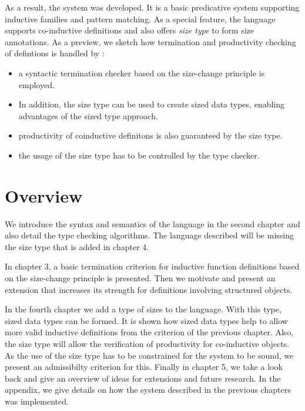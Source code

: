 As a result, the system \mugda was developed.
It is a basic predicative system supporting inductive families and pattern matching. 
As a special feature, the language supports co-inductive definitions and also offers \emph{size type} to form size annotations. 
As a preview, we sketch how termination and productivity checking of defintions is handled by \mugda:
\begin{itemize}
\item
a syntactic termination checker based on the size-change principle is employed.
\item
In addition, the size type can be used to create sized data types, enabling advantages of the 
sized type approach.
\item
productivity of coinductive definitons is also guaranteed by the size type.
\item
the usage of the size type has to be controlled by the type checker.
\end{itemize}  
\section{Overview}
We introduce the syntax and semantics of the \mugda language in the second chapter and also detail the type checking algorithms. The language described will be missing the size type that is added in chapter 4. 

In chapter 3, a basic termination criterion for inductive function definitions based on the size-change principle is presented. Then we motivate and present an extension that increases its strength for definitions involving structured objects.

In the fourth chapter we add a type of sizes to the language.
With this type, sized data types can be formed. It is shown how sized data types help to allow more valid inductive definitions from the criterion of the previous chapter.
Also, the size type will allow the verification of productivity for co-inductive objects.
As the use of the size type has to be constrained for the system to be sound, we present an admissibilty criterion for this.
Finally in chapter 5, we take a look back and give an overview of ideas for extensions and future research.
In the appendix, we give details on how the system described in the previous chapters was implemented.






